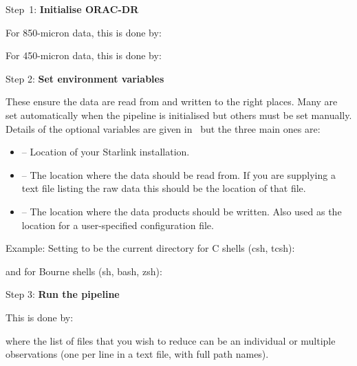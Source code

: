 \begin{aligndesc}
\item[Step~1:]
\textbf{Initialise ORAC-DR}

For 850-micron data, this is done by:
\begin{terminalv}
\end{terminalv}

\vspace{0.2cm}

For 450-micron data, this is done by:

\begin{terminalv}
\end{terminalv}

\vspace{0.2cm}

\item[Step 2:]
\textbf{Set environment variables}

These ensure the data are read from and written to the right
places. Many are set automatically when the pipeline is initialised
but others must be set manually. Details of the optional variables are
given in \pipelinesun\ but the three main ones are:

\begin{itemize}\itemsep-0.1em
\item {} -- Location of your Starlink installation.
\item {} -- The location where the data should be read from.
If you are supplying a text file listing the raw data this should be the
location of that file.
\item {} -- The location where the data products should be
written. Also used as the location for a user-specified configuration file.
\end{itemize}

Example: Setting  to be the current
directory for C shells (csh, tcsh):

\begin{terminalv}
\end{terminalv}

\newpage

and for Bourne shells (sh, bash, zsh):

\begin{terminalv}
\end{terminalv}


\item[Step 3:]
\textbf{Run the pipeline}

This is done by:
\begin{terminalv}
\end{terminalv}

\vspace{0.2cm}

where the list of files that you wish to reduce can be
an individual or multiple observations (one per line in a text file,
with full path names).

\end{aligndesc}


